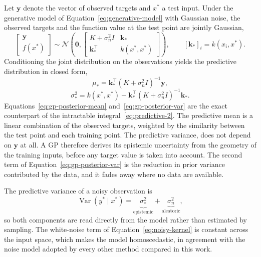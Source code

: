 Let $\mathbf{y}$ denote the vector of observed targets and $x^\ast$ a test input. Under the
generative model of Equation~\eqref{eq:generative-model} with Gaussian noise, the observed
targets and the function value at the test point are jointly Gaussian,
%
\begin{equation}
    \begin{bmatrix} \mathbf{y} \\ f(x^\ast) \end{bmatrix}
    \sim
    \mathcal{N}\!\left(
      \mathbf{0},
      \begin{bmatrix}
        K + \sigma_n^2 I & \mathbf{k}_\ast \\
        \mathbf{k}_\ast^{\!\top} & k(x^\ast, x^\ast)
      \end{bmatrix}
    \right),
    \qquad
    \left[\mathbf{k}_\ast\right]_i = k(x_i, x^\ast) .
    \label{eq:gp-joint}
\end{equation}
%
Conditioning the joint distribution on the observations yields the predictive distribution in
closed form,
%
\begin{equation}
    \mu_\ast
    = \mathbf{k}_\ast^{\!\top}
      \left(K + \sigma_n^2 I\right)^{-1} \mathbf{y},
    \label{eq:gp-posterior-mean}
\end{equation}
%
\begin{equation}
    \sigma_\ast^2
    = k(x^\ast, x^\ast)
      - \mathbf{k}_\ast^{\!\top}
        \left(K + \sigma_n^2 I\right)^{-1} \mathbf{k}_\ast .
    \label{eq:gp-posterior-var}
\end{equation}
%
Equations~\eqref{eq:gp-posterior-mean} and~\eqref{eq:gp-posterior-var} are the exact
counterpart of the intractable integral~\eqref{eq:predictive-2}.  The predictive mean is a linear combination of the observed targets, weighted by the similarity between the test point and each training point. The predictive variance, does not depend on $\mathbf{y}$ at all. A GP therefore derives its epistemic uncertainty from the geometry of the training inputs, before any target value is taken into account. The second term of Equation~\eqref{eq:gp-posterior-var} is the reduction in prior variance contributed by the data, and it fades away where no data are available.

The predictive variance of a noisy observation is
%
\begin{equation}
    \operatorname{Var}\!\left(y^\ast \mid x^\ast\right)
    = \underbrace{\sigma_\ast^2}_{\text{epistemic}}
      + \underbrace{\sigma_n^2}_{\text{aleatoric}} ,
    \label{eq:gp-variance-split}
\end{equation}
%
so both components are read directly from the model rather than estimated by sampling. 
The white-noise term of Equation~\eqref{eq:noisy-kernel} is constant across the input space, which
makes the model homoscedastic, in agreement with the noise model adopted by every other method
compared in this work.

